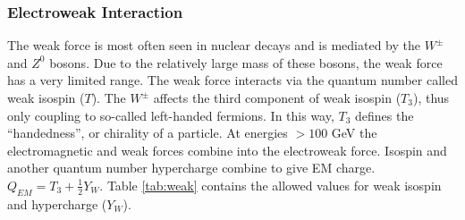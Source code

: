 		\subsubsection{Electroweak Interaction}\label{sssec:Electroweak}
			The weak force is most often seen in nuclear decays and is mediated by the $W^{\pm}$ and $Z^0$ bosons. Due to the relatively large mass of these bosons, the weak force has a very limited range. The weak force interacts via the quantum number called weak isospin ($T$). The $W^{\pm}$ affects the third component of weak isospin ($T_3$), thus only coupling to so-called left-handed fermions. In this way, $T_{3}$ defines the ``handedness'', or chirality of a particle. At energies $> 100 $ GeV the electromagnetic and weak forces combine into the electroweak force. Isospin and another quantum number hypercharge combine to give \gls{EM} charge. $Q_{EM} = T_3 + \frac{1}{2} Y_W$. Table \ref{tab:weak} contains the allowed values for weak isospin and hypercharge ($Y_W$). 

